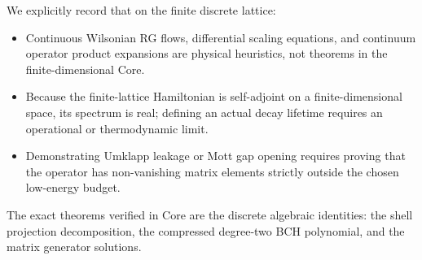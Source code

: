 \begin{remark}
We explicitly record that on the finite discrete lattice:
\begin{itemize}
    \item Continuous Wilsonian RG flows, differential scaling equations, and continuum operator product expansions are physical heuristics, not theorems in the finite-dimensional Core.
    \item Because the finite-lattice Hamiltonian is self-adjoint on a finite-dimensional space, its spectrum is real; defining an actual decay lifetime requires an operational or thermodynamic limit.
    \item Demonstrating Umklapp leakage or Mott gap opening requires proving that the operator has non-vanishing matrix elements strictly outside the chosen low-energy budget.
\end{itemize}
The exact theorems verified in Core are the discrete algebraic identities: the shell projection decomposition, the compressed degree-two BCH polynomial, and the matrix generator solutions.
\end{remark}
